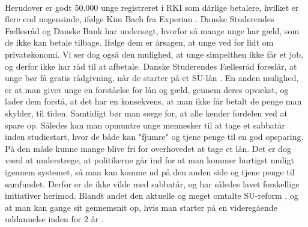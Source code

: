 \\
Herudover er godt 50.000 unge registreret i RKI som dårlige betalere, hvilket er flere end nogensinde, ifølge Kim Bach fra Experian \cite{dr.dk}. Danske Studerendes Fællesråd og Danske Bank har undersøgt, hvorfor så mange unge har gæld, som de ikke kan betale tilbage. Ifølge dem er årsagen, at unge ved for lidt om privatøkonomi. Vi ser dog også den mulighed, at unge simpelthen ikke får et job, og derfor ikke har råd til at afbetale. Danske Studerendes Fællesråd foreslår, at unge bør få gratis rådgivning, når de starter på et SU-lån \cite{dr.dk}. En anden mulighed, er at man giver unge en forståelse for lån og gæld, gennem deres opvækst, og lader dem forstå, at det har en konsekvens, at man ikke får betalt de penge man skylder, til tiden. Samtidigt bør man sørge for, at alle kender fordelen ved at spare op. Således kan man opmuntre unge mennesker til at tage et sabbatår inden studiestart, hvor de både kan "fjumre" og tjene penge til en god opsparing. På den måde kunne mange blive fri for overhovedet at tage et lån.
Det er dog værd at understrege, at politikerne går ind for at man kommer hurtigst muligt igennem systemet, så man kan komme ud på den anden side og tjene penge til samfundet. Derfor er de ikke vilde med sabbatår, og har således lavet forskellige initiativer herimod. Blandt andet den aktuelle og meget omtalte SU-reform \cite{SUreform}, og at man kan gange sit gennemsnit op, hvis man starter på en videregående uddannelse inden for 2 år \cite{SabbatAar}.
 